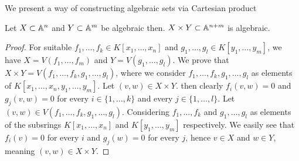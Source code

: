 We present a way of constructing algebraic sets via Cartesian product
\begin{proposition}
    Let $X\subset \mathbb{A}^n$ and $Y\subset \mathbb{A}^m$ be algebraic then. $X\times Y \subset \mathbb{A}^{n+m}$ is algebraic.
\end{proposition}
\begin{proof}
    For suitable $f_1,\dots,f_k \in K[x_1,\dots,x_n]$  and $g_1,\dots, g_l \in K[y_1,\dots,y_m]$, we have $X = V(f_1,\dots,f_m)$ and $Y=V(g_1,\dots,g_l)$. We prove that $X\times Y = V(f_1,\dots,f_k,g_1,\dots,g_l)$, where we consider $f_1,\dots,f_k,g_1,\dots,g_l$ as elements of $K[x_1,\dots,x_n,y_1,\dots,y_m]$. Let $(v,w)\in X\times Y$. then clearly $f_i(v,w) = 0$ and $g_j(v,w)=0$ for every $i\in\{1,\dots,k\}$ and every $j\in\{1,\dots, l\}$. Let $(v,w)\in V(f_1,\dots,f_k,g_1,\dots,g_l)$. Considering $f_1,\dots,f_k$ and $g_1,\dots,g_l$ as elements of the subsrings $K[x_1,\dots,x_n]$ and $K[y_1,\dots,y_m]$ respectively. We easily see that $f_i(v) = 0$ for every $i$ and $g_j(w) = 0$ for every $j$, hence $v \in X$ and $w\in Y$, meaning $(v,w)\in X \times Y$. 
\end{proof}

